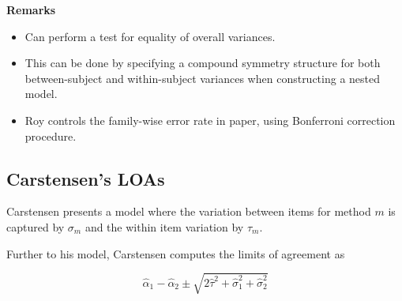 \documentclass[compress]{beamer}        %
\makeatletter
\newcommand{\tcb}{\textcolor{beamer@blendedblue}}
\makeatother
\begin{document}
\begin{frame}[fragile]{\bf \tcb{Remarks}}
\begin{itemize}
\item Can perform a test for equality of overall variances.\\
\vspace{0.25cm}\item This can be done by specifying a compound symmetry structure for both between-subject and within-subject variances when constructing a nested model.\\
\vspace{0.25cm}\item Roy controls the family-wise error rate in paper, using Bonferroni correction procedure.
\end{itemize}
\end{frame}

\subsection{Carstensen's LOAs}
\begin{frame}
Carstensen presents a model where the variation between items for
method $m$ is captured by $\sigma_m$ and the within item variation
by $\tau_m$.

Further to his model, Carstensen computes the limits of agreement
as

\[
\hat{\alpha}_1 - \hat{\alpha}_2 \pm \sqrt{2 \hat{\tau}^2 +
\hat{\sigma}^2_1 + \hat{\sigma}^2_2}
\]
\end{frame}
\end{document}
